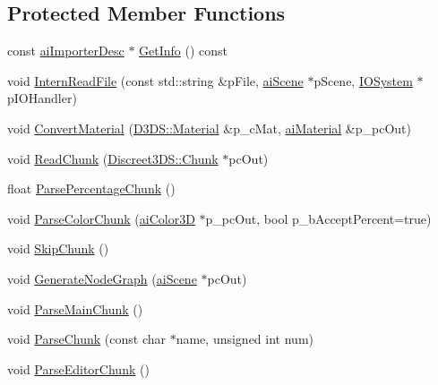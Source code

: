 \subsection*{Protected Member Functions}
\begin{DoxyCompactItemize}
\item 
const \hyperlink{structai_importer_desc}{ai\+Importer\+Desc} $\ast$ \hyperlink{class_assimp_1_1_discreet3_d_s_importer_a802b9ca9e70bce3953410b17c3ab5abd}{Get\+Info} () const 
\item 
void \hyperlink{class_assimp_1_1_discreet3_d_s_importer_abf7e6eb912d47870e4b3ceec16376a90}{Intern\+Read\+File} (const std\+::string \&p\+File, \hyperlink{structai_scene}{ai\+Scene} $\ast$p\+Scene, \hyperlink{class_assimp_1_1_i_o_system}{I\+O\+System} $\ast$p\+I\+O\+Handler)
\item 
void \hyperlink{class_assimp_1_1_discreet3_d_s_importer_ad751da562aaf0355ac757f8f9ccb48f9}{Convert\+Material} (\hyperlink{struct_assimp_1_1_d3_d_s_1_1_material}{D3\+D\+S\+::\+Material} \&p\+\_\+c\+Mat, \hyperlink{classai_material}{ai\+Material} \&p\+\_\+pc\+Out)
\item 
void \hyperlink{class_assimp_1_1_discreet3_d_s_importer_a06fa96fa8a91de3f8a53f85b815a012a}{Read\+Chunk} (\hyperlink{struct_assimp_1_1_d3_d_s_1_1_discreet3_d_s_1_1_chunk}{Discreet3\+D\+S\+::\+Chunk} $\ast$pc\+Out)
\item 
float \hyperlink{class_assimp_1_1_discreet3_d_s_importer_aa6600a8ca104382d64c5ae6d15d7c43f}{Parse\+Percentage\+Chunk} ()
\item 
void \hyperlink{class_assimp_1_1_discreet3_d_s_importer_a4867514c89575df1f0786b34ab48a716}{Parse\+Color\+Chunk} (\hyperlink{structai_color3_d}{ai\+Color3\+D} $\ast$p\+\_\+pc\+Out, bool p\+\_\+b\+Accept\+Percent=true)
\item 
void \hyperlink{class_assimp_1_1_discreet3_d_s_importer_ae8ba3bb8337261d43e466eaf9300bc91}{Skip\+Chunk} ()
\item 
void \hyperlink{class_assimp_1_1_discreet3_d_s_importer_aa14d101ea3af31de1a2a1d69d4000fba}{Generate\+Node\+Graph} (\hyperlink{structai_scene}{ai\+Scene} $\ast$pc\+Out)
\item 
void \hyperlink{class_assimp_1_1_discreet3_d_s_importer_adbcf9fbe5c00a734e1939dbadd75604e}{Parse\+Main\+Chunk} ()
\item 
void \hyperlink{class_assimp_1_1_discreet3_d_s_importer_a73f4620770f9025734df29b2e5f877a3}{Parse\+Chunk} (const char $\ast$name, unsigned int num)
\item 
void \hyperlink{class_assimp_1_1_discreet3_d_s_importer_addcb60797b0e32d22344072686c689c5}{Parse\+Editor\+Chunk} ()

\end{DoxyCompactItemize}
